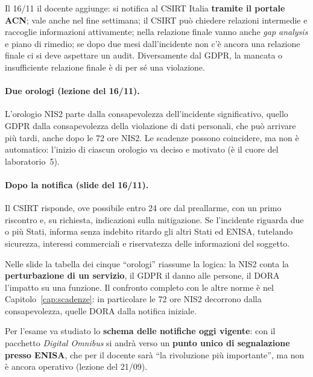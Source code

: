 Il 16/11 il docente aggiunge: si notifica al CSIRT Italia \textbf{tramite il portale ACN}; vale anche nel
fine settimana; il CSIRT può chiedere relazioni intermedie e raccoglie informazioni attivamente; nella
relazione finale vanno anche \emph{gap analysis} e piano di rimedio; se dopo due mesi dall'incidente
non c'è ancora una relazione finale ci si deve aspettare un audit. Diversamente dal GDPR, la mancata o
insufficiente relazione finale è di per sé una violazione.

\paragraph{Due orologi (lezione del 16/11).} L'orologio NIS2 parte dalla consapevolezza
dell'incidente significativo, quello GDPR dalla consapevolezza della violazione di dati personali, che
può arrivare più tardi, anche dopo le 72 ore NIS2. Le scadenze possono coincidere, ma non è automatico:
l'inizio di ciascun orologio va deciso e motivato (è il cuore del laboratorio~5).

\paragraph{Dopo la notifica (slide del 16/11).} Il CSIRT risponde, ove possibile entro 24 ore dal
preallarme, con un primo riscontro e, su richiesta, indicazioni sulla mitigazione. Se l'incidente
riguarda due o più Stati, informa senza indebito ritardo gli altri Stati ed ENISA, tutelando sicurezza,
interessi commerciali e riservatezza delle informazioni del soggetto.

Nelle slide la tabella dei cinque ``orologi'' riassume la logica: la NIS2 conta la
\textbf{perturbazione di un servizio}, il GDPR il danno alle persone, il DORA l'impatto su una funzione.
Il confronto completo con le altre norme è nel Capitolo~\ref{cap:scadenze}: in particolare le 72 ore
NIS2 decorrono dalla consapevolezza, quelle DORA dalla notifica iniziale.

\begin{esame}
Per l'esame va studiato lo \textbf{schema delle notifiche oggi vigente}: con il pacchetto
\emph{Digital Omnibus} si andrà verso un \textbf{punto unico di segnalazione presso ENISA}, che per il
docente sarà ``la rivoluzione più importante'', ma non è ancora operativo (lezione del 21/09).
\end{esame}


